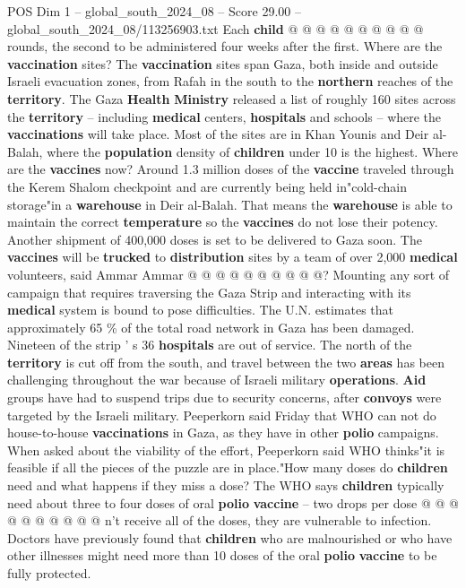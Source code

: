\begin{textsample}{POS Dim 1 – global\_south\_2024\_08 – Score 29.00 – global\_south\_2024\_08/113256903.txt}
Each \textbf{child} @ @ @ @ @ @ @ @ @ @ rounds, the second to be administered four weeks after the first.
Where are the \textbf{vaccination} sites?
The \textbf{vaccination} sites span Gaza, both inside and outside Israeli evacuation zones, from Rafah in the south to the \textbf{northern} reaches of the \textbf{territory}.
The Gaza \textbf{Health} \textbf{Ministry} released a list of roughly 160 sites across the \textbf{territory} -- including \textbf{medical} centers, \textbf{hospitals} and schools -- where the \textbf{vaccinations} will take place.
Most of the sites are in Khan Younis and Deir al-Balah, where the \textbf{population} density of \textbf{children} under 10 is the highest.
Where are the \textbf{vaccines} now?
Around 1.3 million doses of the \textbf{vaccine} traveled through the Kerem Shalom checkpoint and are currently being held in"cold-chain storage"in a \textbf{warehouse} in Deir al-Balah.
That means the \textbf{warehouse} is able to maintain the correct \textbf{temperature} so the \textbf{vaccines} do not lose their potency.
Another shipment of 400,000 doses is set to be delivered to Gaza soon.
The \textbf{vaccines} will be \textbf{trucked} to \textbf{distribution} sites by a team of over 2,000 \textbf{medical} volunteers, said Ammar Ammar @ @ @ @ @ @ @ @ @ @?
Mounting any sort of campaign that requires traversing the Gaza Strip and interacting with its \textbf{medical} system is bound to pose difficulties.
The U.N. estimates that approximately 65 \% of the total road network in Gaza has been damaged.
Nineteen of the strip ' s 36 \textbf{hospitals} are out of service.
The north of the \textbf{territory} is cut off from the south, and travel between the two \textbf{areas} has been challenging throughout the war because of Israeli military \textbf{operations}. \textbf{Aid} groups have had to suspend trips due to security concerns, after \textbf{convoys} were targeted by the Israeli military.
Peeperkorn said Friday that WHO can not do house-to-house \textbf{vaccinations} in Gaza, as they have in other \textbf{polio} campaigns.
When asked about the viability of the effort, Peeperkorn said WHO thinks"it is feasible if all the pieces of the puzzle are in place."How many doses do \textbf{children} need and what happens if they miss a dose?
The WHO says \textbf{children} typically need about three to four doses of oral \textbf{polio} \textbf{vaccine} -- two drops per dose @ @ @ @ @ @ @ @ @ @ n't receive all of the doses, they are vulnerable to infection.
Doctors have previously found that \textbf{children} who are malnourished or who have other illnesses might need more than 10 doses of the oral \textbf{polio} \textbf{vaccine} to be fully protected.

\end{textsample}
